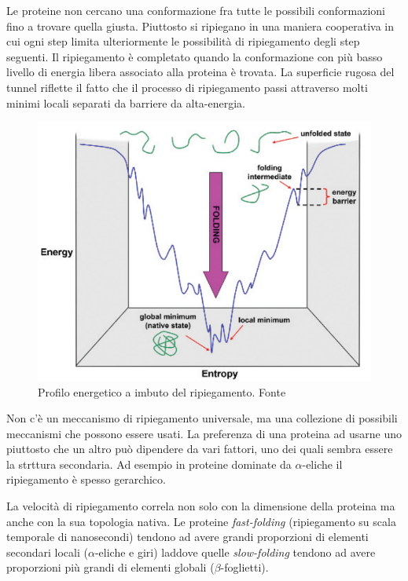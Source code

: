 {{\par Le proteine non cercano una conformazione fra tutte le possibili conformazioni fino a trovare quella giusta. Piuttosto si ripiegano in una maniera cooperativa in cui ogni step limita ulteriormente le possibilità di ripiegamento degli step seguenti. Il ripiegamento è completato quando la conformazione con più basso livello di energia libera associato alla proteina è trovata. La superficie rugosa del tunnel riflette il fatto che il processo di ripiegamento passi attraverso molti minimi locali separati da barriere da alta-energia.

\begin{figure}[!htb]
	\centering
	\includegraphics[scale=0.6]{images/imbuto.png}
	\caption{Profilo energetico a imbuto del ripiegamento. Fonte \cite{kessel_ben-tal_2018}}
	\label{fig:imbuto}
\end{figure}

Non c'è un meccanismo di ripiegamento universale, ma una collezione di possibili meccanismi che possono essere usati. La preferenza di una proteina ad usarne uno piuttosto che un altro può dipendere da vari fattori, uno dei quali sembra essere la strttura secondaria. Ad esempio in proteine dominate da $\alpha$-eliche il ripiegamento è spesso gerarchico. 

\par La velocità di ripiegamento correla non solo con la dimensione della proteina ma anche con la sua topologia nativa. Le proteine \textit{fast-folding} (ripiegamento su scala temporale di nanosecondi) tendono ad avere grandi proporzioni di elementi secondari locali ($\alpha$-eliche e giri) laddove quelle \textit{slow-folding} tendono ad avere proporzioni più grandi di elementi globali ($\beta$-foglietti).

}}
